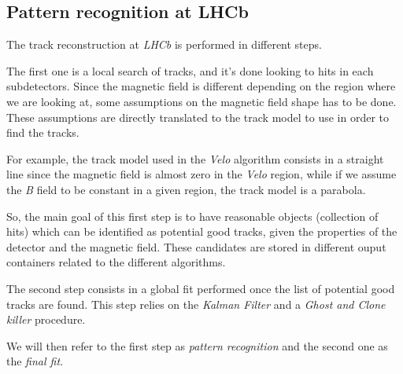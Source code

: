 \documentclass[paper=a4, fontsize=10pt]{scrartcl}
\numberwithin{equation}{section}		%
\numberwithin{figure}{section}			%
\numberwithin{table}{section}				%
\begin{document}
\subsection{Pattern recognition at LHCb}


The track reconstruction at \textit{LHCb} is performed in different steps. 

The first one is a local search of tracks, and it's done looking to hits in each subdetectors. Since the magnetic field is different depending on the region where we are looking at, some assumptions on the magnetic field shape has to be done. These assumptions are directly translated to the track model to use in order to find the tracks.

For example, the track model used in the \textit{Velo} algorithm consists in a straight line since the magnetic field is almost zero in the \textit{Velo} region, while if we assume the \textit{B} field to be constant in a given region, the track model is a parabola.

So, the main goal of this first step is to have reasonable objects (collection of hits) which can be identified as potential good tracks, given the properties of the detector and the magnetic field. These candidates are stored in different ouput containers related to the different algorithms.

The second step consists in a global fit performed once the list of potential good tracks are found. This step relies on the \textit{Kalman Filter} and  a \textit{Ghost and Clone killer} procedure.  

We will then refer to the first step as \textit{pattern recognition} and the second one as the \textit{final fit}. 
\end{document}
